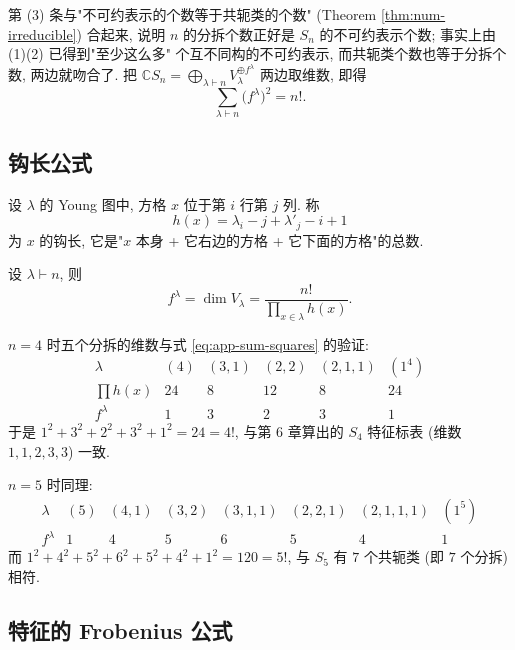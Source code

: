 第 (3) 条与"不可约表示的个数等于共轭类的个数" (Theorem \ref{thm:num-irreducible}) 合起来,
说明 $n$ 的分拆个数正好是 $S_n$ 的不可约表示个数; 事实上由 (1)(2) 已得到"至少这么多"
个互不同构的不可约表示, 而共轭类个数也等于分拆个数, 两边就吻合了.
把 $\mathbb{C}S_n=\bigoplus_{\lambda\vdash n}V_\lambda^{\oplus f^\lambda}$ 两边取维数, 即得
\begin{equation}\label{eq:app-sum-squares}
  \sum_{\lambda\vdash n}\bigl(f^\lambda\bigr)^2=n! .
\end{equation}

\subsection{钩长公式}\label{sec:app-hook}

\begin{definition}[钩长]\label{def:app-hook}
设 $\lambda$ 的 Young 图中, 方格 $x$ 位于第 $i$ 行第 $j$ 列. 称
\[
  h(x)=\lambda_i-j+\lambda'_j-i+1
\]
为 $x$ 的钩长, 它是"$x$ 本身 + 它右边的方格 + 它下面的方格"的总数.
\end{definition}

\begin{theorem}[钩长公式]\label{thm:app-hook}
设 $\lambda\vdash n$, 则
\[
  f^\lambda=\dim V_\lambda=\frac{n!}{\displaystyle\prod_{x\in\lambda}h(x)} .
\]
\end{theorem}

\begin{example}\label{eg:app-hook-S4}
$n=4$ 时五个分拆的维数与式 \eqref{eq:app-sum-squares} 的验证:
\[
\begin{array}{c|ccccc}
  \lambda & (4) & (3,1) & (2,2) & (2,1,1) & (1^4)\\ \hline
  \prod h(x) & 24 & 8 & 12 & 8 & 24\\
  f^\lambda & 1 & 3 & 2 & 3 & 1
\end{array}
\]
于是 $1^2+3^2+2^2+3^2+1^2=24=4!$, 与第 6 章算出的 $S_4$ 特征标表
(维数 $1,1,2,3,3$) 一致.

$n=5$ 时同理:
\[
\begin{array}{c|ccccccc}
  \lambda & (5) & (4,1) & (3,2) & (3,1,1) & (2,2,1) & (2,1,1,1) & (1^5)\\ \hline
  f^\lambda & 1 & 4 & 5 & 6 & 5 & 4 & 1
\end{array}
\]
而 $1^2+4^2+5^2+6^2+5^2+4^2+1^2=120=5!$, 与 $S_5$ 有 $7$ 个共轭类 (即 $7$ 个分拆) 相符.
\end{example}

\subsection{特征的 Frobenius 公式}

